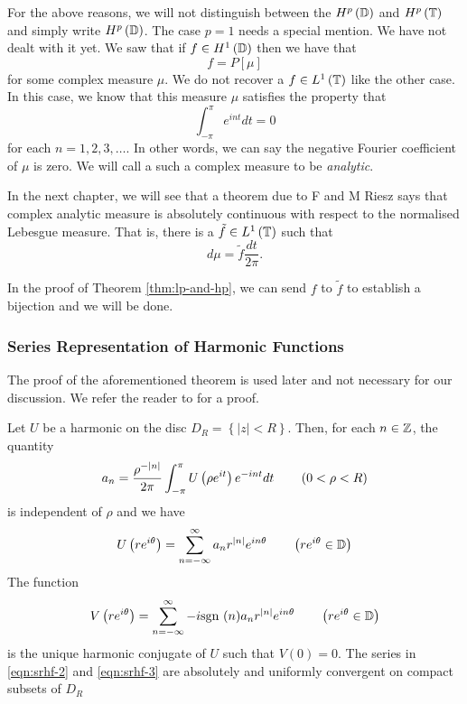 For the above reasons, we will not distinguish between the $H^{p} \left( \mathbb D \right)$ and $H^{p}\left( \mathbb T \right)$ and simply write $H^{p}\left( \mathbb D \right)$. The case $p=1$ needs a special mention. We have not dealt with it yet. We saw that if $f \in H^{1}\left( \mathbb D \right)$ then we have that 
\begin{equation*}
    f = P[\mu]
\end{equation*}
for some complex measure $\mu$. We do not recover a $f\in L^{1} \left( \mathbb T \right)$ like the other case. In this case, we know that this measure $\mu$ satisfies the property that
\begin{equation*}
    \int_{-\pi}^{\pi} e^{int} dt = 0
\end{equation*}
for each $n=1,2,3,\ldots$. In other words, we can say the negative Fourier coefficient of $\mu$ is zero. We will call a such a complex measure to be \textit{analytic}.

In the next chapter, we will see that a theorem due to F and M Riesz says that complex analytic measure is absolutely continuous with respect to the normalised Lebesgue measure. That is, there is a $\tilde{f}\in L^{1} \left( \mathbb T \right)$ such that 
\begin{equation*}
    d\mu = \tilde{f} \frac{dt}{2\pi}.
\end{equation*}

In the proof of Theorem \ref{thm:lp-and-hp}, we can send $f$ to $\tilde{f}$ to establish a bijection and we will be done.

\subsubsection{Series Representation of Harmonic Functions}

The proof of the aforementioned theorem is used later and not necessary for our discussion. We refer the reader to \cite{mashreghi2009representation} for a proof.

\begin{theorem}
    Let $U$ be a harmonic on the disc $D_{R} = \left\{ |z| < R \right\}$. Then, for each $n\in \mathbb Z$, the quantity
    \begin{equation}
	a_{n} = \frac{\rho^{-\left\lvert n \right\rvert}}{2\pi} \int_{-\pi}^{\pi} U\left( \rho e^{it} \right) e^{-int} dt \qquad \left( 0 < \rho < R \right)
	\label{eqn:srhf-1}
    \end{equation}
    is independent of $\rho$ and we have
    \begin{equation}
	U\left( re^{i\theta} \right) = \sum_{n=-\infty}^{\infty} a_{n} r^{\left\lvert n \right\rvert} e^{in\theta} \qquad \left( re^{i\theta} \in \mathbb D \right)
	\label{eqn:srhf-2}
    \end{equation}
    The function
    \begin{equation}
	V\left( re^{i\theta} \right) = \sum_{n=-\infty}^{\infty} -i \text{sgn } (n) a_{n} r^{\left\lvert n \right\rvert} e^{in\theta} \qquad \left( re^{i\theta} \in \mathbb D \right)
	\label{eqn:srhf-3}
    \end{equation}
    is the unique harmonic conjugate of $U$ such that $V\left( 0 \right)  = 0$. The series in \ref{eqn:srhf-2} and \ref{eqn:srhf-3} are absolutely and uniformly convergent on compact subsets of $D_{R}$
    \label{thm:srhf}
\end{theorem}
